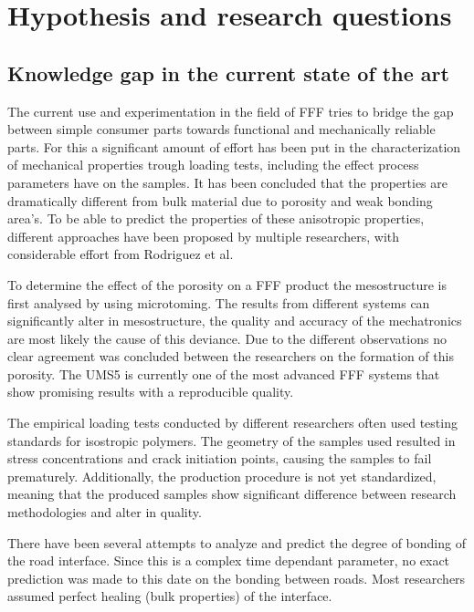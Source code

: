\chapter{Hypothesis and research questions}
\label{chp:innovative_chapter}

\graphicspath{{chapter_3/figures/}} %

\section{Knowledge gap in the current state of the art}
\label{Knowledge gap in the current state of the art}
The current use and experimentation in the field of FFF tries to bridge the gap between simple consumer parts towards functional and mechanically reliable parts. For this a significant amount of effort has been put in the characterization of mechanical properties trough loading tests, including the effect process parameters have on the samples. It has been concluded that the properties are dramatically different from bulk material due to porosity and weak bonding area's. To be able to predict the properties of these anisotropic properties, different approaches have been proposed by multiple researchers, with considerable effort from  Rodriguez et al\cite{Rodriguez2003MechanicalModeling}. 

To determine the effect of the porosity on a FFF product the mesostructure is first analysed by using microtoming. The results from different systems can significantly alter in mesostructure, the quality and accuracy of the mechatronics are most likely the cause of this deviance. Due to the different observations no clear agreement was concluded between the researchers on the formation of this porosity. The UMS5 is currently one of the most advanced FFF systems that show promising results with a reproducible quality.

The empirical loading tests conducted by different researchers often used testing standards for isostropic polymers. The geometry of the samples used resulted in stress concentrations and crack initiation points, causing the samples to fail prematurely. Additionally, the production procedure is not yet standardized, meaning that the produced samples show significant difference between research methodologies and alter in quality.

There have been several attempts to analyze and predict the degree of bonding of the road interface. Since this is a complex time dependant parameter, no exact prediction was made to this date on the bonding between roads. Most researchers assumed perfect healing (bulk properties) of the interface. 

